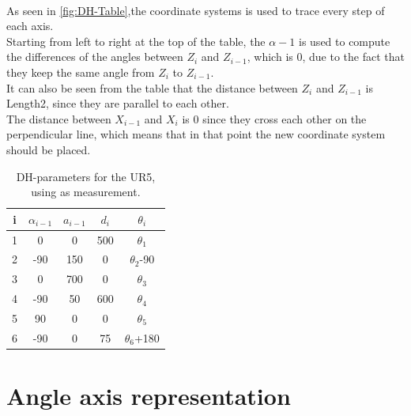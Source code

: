 \\
As seen in \ref{fig:DH-Table},the coordinate systems is used to trace every step of each axis.\\
Starting from left to right at the top of the table, the $\alpha-1$ is used to compute the differences of the angles between $Z_{i}$ and $Z_{i-1}$, which is 0, due to the fact that they keep the same angle from $Z_{i}$  to $Z_{i-1}$.\\
It can also be seen from the table that the distance between $Z_{i}$ and $Z_{i-1}$ is Length2, since they are parallel to each other.\\ 
The distance between $X_{i-1}$ and $X_i$ is 0 since they cross each other on the perpendicular line, which means that in that point the new coordinate system should be placed.\\

\begin{table}[h!]
\centering
\begin{tabular}{||c c c c c||} 
 \hline
 i & $\alpha_{i-1}$ & $a_{i-1}$ & $d_{i}$ & $\theta_{i}$ \\ [0.5ex] 
 \hline 
 \hline
 1 & 0 & 0 & 500 & $\theta_{1}$ \\ 
 2 & -90 & 150 & 0 & $\theta_{2}$-90 \\
 3 & 0 & 700 & 0 & $\theta_{3}$ \\
 4 & -90 & 50 & 600 & $\theta_{4}$ \\
 5 & 90 & 0 & 0 & $\theta_{5}$ \\ 
 6 & -90 & 0 & 75 & $\theta_{6}$+180\\[1ex] 
 \hline
\end{tabular}
\caption{DH-parameters for the UR5, using \cite{DHPar} as measurement.}
\label{table:1}
\end{table}

\section{Angle axis representation}

